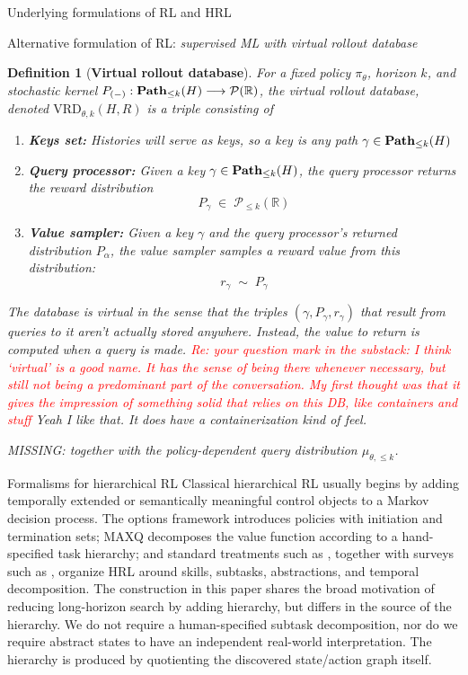 \documentclass[11pt]{article}
\newtheorem{definition}[subsubsection]{Definition}
\begin{document}
\begin{section}{Underlying formulations of RL and HRL}
\begin{subsection}{Alternative formulation of RL: {\em supervised ML with virtual rollout database}}
\begin{definition}[{\bf Virtual rollout database}]
\normalfont
For a fixed policy $\pi_\theta$, horizon $k$, and stochastic kernel $P_{(-)}:\bold{Path}_{\le k}(H)\longrightarrow\mathcal{P}(\mathbb{R})$, the {\em virtual rollout database}, denoted $\text{VRD}_{\theta,k}(H,R)$ is a triple  consisting of
\begin{enumerate}
\item {\bf Keys set:} Histories will serve as {\em keys}, so a key is any path $\gamma\in\bold{Path}_{\le k}(H)$
\item {\bf Query processor:} Given a key $\gamma\in\bold{Path}_{\le k}(H)$, the {\em query processor} returns the reward distribution
$$
P_{\gamma}\;\in\;\mathcal{P}_{\le k}(\mathbb{R})
$$
\item {\bf Value sampler:} Given a key $\gamma$ and the query processor's returned distribution $P_{\alpha}$, the {\em value sampler} samples a reward value from this distribution:
$$
r_{\gamma}\;\sim\;P_{\gamma}
$$
\end{enumerate}
The database is {\em virtual} in the sense that the triples $(\gamma,P_{\gamma},r_\gamma)$ that result from queries to it aren't actually stored anywhere. Instead, the value to return is computed when a query is made. 
\textcolor{red}{Re: your question mark in the substack: I think `virtual' is a good name. It has the sense of being there whenever necessary, but still not being a predominant part of the conversation. My first thought was that it gives the impression of something solid that relies on this DB, like containers and stuff} {\color{blue} Yeah I like that. It does have a containerization kind of feel.}

{\color{blue} MISSING: together with the policy-dependent query distribution $\mu_{\theta,\le k}$. }
\end{definition}

\end{subsection}

\begin{subsection}{Formalisms for hierarchical RL}
Classical hierarchical RL usually begins by adding temporally extended or semantically meaningful control objects to a Markov decision process. The options framework \cite{SPS} introduces policies with initiation and termination sets; MAXQ \cite{Diet} decomposes the value function according to a hand-specified task hierarchy; and standard treatments such as \cite{SBRL}, together with surveys such as \cite{PSTQ,HutsebautBuysseHRLSurvey}, organize HRL around skills, subtasks, abstractions, and temporal decomposition. The construction in this paper shares the broad motivation of reducing long-horizon search by adding hierarchy, but differs in the source of the hierarchy. We do not require a human-specified subtask decomposition, nor do we require abstract states to have an independent real-world interpretation. The hierarchy is produced by quotienting the discovered state/action graph itself.


\end{subsection}
\end{section}
\end{document}
